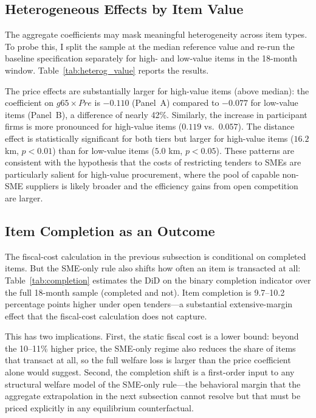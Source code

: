

\subsection{Heterogeneous Effects by Item Value}

The aggregate coefficients may mask meaningful heterogeneity across item types. To probe this, I split the sample at the median reference value and re-run the baseline specification separately for high- and low-value items in the 18-month window. Table~\ref{tab:heterog_value} reports the results.



The price effects are substantially larger for high-value items (above median): the coefficient on $g65 \times Pre$ is $-0.110$ (Panel~A) compared to $-0.077$ for low-value items (Panel~B), a difference of nearly 42\%. Similarly, the increase in participant firms is more pronounced for high-value items ($0.119$ vs.\ $0.057$). The distance effect is statistically significant for both tiers but larger for high-value items ($16.2$ km, $p<0.01$) than for low-value items ($5.0$ km, $p<0.05$). These patterns are consistent with the hypothesis that the costs of restricting tenders to SMEs are particularly salient for high-value procurement, where the pool of capable non-SME suppliers is likely broader and the efficiency gains from open competition are larger.

\subsection{Item Completion as an Outcome}

The fiscal-cost calculation in the previous subsection is conditional on completed items. But the SME-only rule also shifts how often an item is transacted at all: Table~\ref{tab:completion} estimates the DiD on the binary completion indicator over the full 18-month sample (completed and not). Item completion is 9.7--10.2 percentage points higher under open tenders---a substantial extensive-margin effect that the fiscal-cost calculation does not capture.



This has two implications. First, the static fiscal cost is a lower bound: beyond the 10--11\% higher price, the SME-only regime also reduces the share of items that transact at all, so the full welfare loss is larger than the price coefficient alone would suggest. Second, the completion shift is a first-order input to any structural welfare model of the SME-only rule---the behavioral margin that the aggregate extrapolation in the next subsection cannot resolve but that must be priced explicitly in any equilibrium counterfactual.

